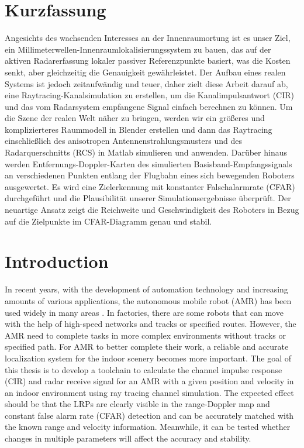 \documentclass[12pt,DIV14,BCOR12mm,a4paper,footinclude=false,headinclude,parskip=half-,twoside,openright,cleardoublepage=empty,toc=index,bibliography=totoc,listof=totoc]{scrreprt}
\numberwithin{equation}{chapter}
\begin{document}
\begin{minipage}[t]{\textwidth}
    \chapter*{Kurzfassung}
    Angesichts des wachsenden Interesses an der Innenraumortung ist es unser Ziel, ein Millimeterwellen-Innenraumlokalisierungssystem zu bauen, das auf der aktiven Radarerfassung lokaler passiver Referenzpunkte basiert, was die Kosten senkt, aber gleichzeitig die Genauigkeit gewährleistet. Der Aufbau eines realen Systems ist jedoch zeitaufwändig und teuer, daher zielt diese Arbeit darauf ab, eine Raytracing-Kanalsimulation zu erstellen, um die Kanalimpulsantwort (CIR) und das vom Radarsystem empfangene Signal einfach berechnen zu können. Um die Szene der realen Welt näher zu bringen, werden wir ein größeres und komplizierteres Raummodell in Blender erstellen und dann das Raytracing einschließlich des anisotropen Antennenstrahlungsmusters und des Radarquerschnitts (RCS) in Matlab simulieren und anwenden. Darüber hinaus werden Entfernungs-Doppler-Karten des simulierten Basisband-Empfangssignals an verschiedenen Punkten entlang der Flugbahn eines sich bewegenden Roboters ausgewertet. Es wird eine Zielerkennung mit konstanter Falschalarmrate (CFAR) durchgeführt und die Plausibilität unserer Simulationsergebnisse überprüft. Der neuartige Ansatz zeigt die Reichweite und Geschwindigkeit des Roboters in Bezug auf die Zielpunkte im CFAR-Diagramm genau und stabil.
\end{minipage}

\cleardoublepage
\setcounter{page}{1}


\chapter{Introduction} \label{introduction}
In recent years, with the development of automation technology and increasing amounts of various applications, the autonomous mobile robot (AMR) has been used widely in many areas \cite{usage_AMR}. In factories, there are some robots that can move with the help of high-speed networks and tracks or specified routes. However, the AMR need to complete tasks in more complex environments without tracks or specified path. For AMR to better complete their work, a reliable and accurate localization system for the indoor scenery becomes more important. The goal of this thesis is to develop a toolchain to calculate the channel impulse response (CIR) and radar receive signal for an AMR with a given position and velocity in an indoor environment using ray tracing channel simulation. The expected effect should be that the LRPs are clearly visible in the range-Doppler map and constant false alarm rate (CFAR) detection and can be accurately matched with the known range and velocity information. Meanwhile, it can be tested whether changes in multiple parameters will affect the accuracy and stability.
\end{document}
